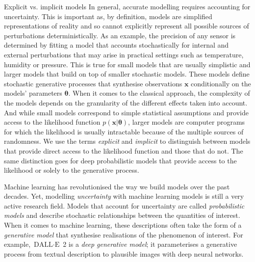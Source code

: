 \begin{side_note}{Explicit vs. implicit models}
  In general, accurate modelling requires accounting for uncertainty. This is important as, by definition, models are simplified representations of reality and so cannot explicitly represent all possible sources of perturbations deterministically. As an example, the precision of any sensor is determined by fitting a model that accounts stochastically for internal and external perturbations that may arise in practical settings such as temperature, humidity or pressure. This is true for small models that are usually simplistic and larger models that build on top of smaller stochastic models. These models define stochastic generative processes that synthesise observations $\mathbf{x}$ conditionally on the models' parameters $\mathbf{\theta}$. When it comes to the classical approach, the complexity of the models depends on the granularity of the different effects taken into account. And while small models correspond to simple statistical assumptions and provide access to the likelihood function $p(\mathbf{x}|\mathbf{\theta})$, larger models are computer programs for which the likelihood is usually intractable because of the multiple sources of randomness. We use the terms \textit{explicit} and \textit{implicit} to distinguish between models that provide direct access to the likelihood function and those that do not. The same distinction goes for deep probabilistic models that provide access to the likelihood or solely to the generative process.
\end{side_note}


Machine learning has revolutionised the way we build models over the past decades. Yet, modelling \textit{uncertainty} with machine learning models is still a very active research field. Models that account for uncertainty are called \textit{probabilistic models} and describe stochastic relationships between the quantities of interest. When it comes to machine learning, these descriptions often take the form of a \textit{generative model} that synthesise realisations of the phenomenon of interest. For example, $\text{DALL}\cdot\text{E}$ 2 is a \textit{deep generative model}; it parameterises a generative process from textual description to plausible images with deep neural networks.

